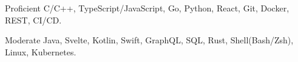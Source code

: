 

\begin{cvskills}

  \cvskill
    {Proficient} %
    {C/C++, TypeScript/JavaScript, Go, Python, React, Git, Docker, REST, CI/CD.} %

  \cvskill
    {Moderate} %
    {Java, Svelte, Kotlin, Swift, GraphQL, SQL, Rust, Shell(Bash/Zsh), Linux, Kubernetes.} %

\end{cvskills}
